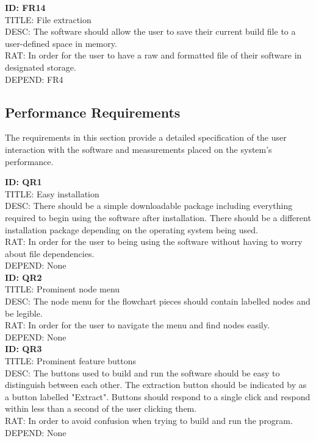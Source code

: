 \documentclass[journal,10pt,onecolumn,compsoc]{IEEEtran} \usepackage[margin=1.0in]{geometry} \usepackage{pdfpages} \usepackage{graphicx}
\begin{document}
\noindent
\textbf{ID: FR14}\\
TITLE: File extraction\\
DESC: The software should allow the user to save their current build file to a user-defined space in memory.\\
RAT: In order for the user to have a raw and formatted file of their software in designated storage.\\
DEPEND: FR4\\


\subsection{Performance Requirements}

The requirements in this section provide a detailed specification of the user interaction with the software and measurements placed on the system's performance.

\noindent
\textbf{ID: QR1}\\
TITLE: Easy installation\\
DESC: There should be a simple downloadable package including everything required to begin using the software after installation.
There should be a different installation package depending on the operating system being used.\\
RAT: In order for the user to being using the software without having to worry about file dependencies.\\
DEPEND: None\\

\noindent
\textbf{ID: QR2}\\
TITLE: Prominent node menu\\
DESC: The node menu for the flowchart pieces should contain labelled nodes and be legible.\\
RAT: In order for the user to navigate the menu and find nodes easily.\\
DEPEND: None\\

\noindent
\textbf{ID: QR3}\\
TITLE: Prominent feature buttons\\
DESC: The buttons used to build and run the software should be easy to distinguish between each other. 
The extraction button should be indicated by as a button labelled "Extract".
Buttons should respond to a single click and respond within less than a second of the user clicking them.\\
RAT: In order to avoid confusion when trying to build and run the program.\\
DEPEND: None\\
\end{document}
